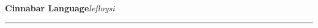 \documentclass{article}
\begin{document}
\noindent
{\Huge\bfseries Cinnabar Language}\quad\textit{lefloysi}

\vspace{0.8em}
\noindent\rule{\textwidth}{0.4pt}



\end{document}
